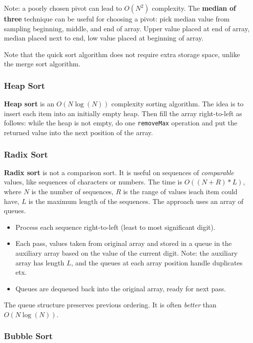Note: a poorly chosen pivot can lead to $O(N^{2})$ complexity. The \textbf{median of three} technique can be useful for choosing a pivot: pick median value from sampling beginning, middle, and end of array. Upper value placed at end of array, median placed next to end, low value placed at beginning of array. 

Note that the quick sort algorithm does not require extra storage space, unlike the merge sort algorithm. 

\subsubsection{Heap Sort}

\textbf{Heap sort} is an $O(N \log(N))$ complexity sorting algorithm. The idea is to insert each item into an initially empty heap. Then fill the array right-to-left as follows: while the heap is not empty, do one \texttt{removeMax} operation and put the returned value into the next position of the array. 

\subsubsection{Radix Sort}

\textbf{Radix sort} is not a comparison sort. It is useful on sequences of \textit{comparable} values, like sequences of characters or numbers. The time is $O((N + R)*L)$, where $N$ is the number of sequences, $R$ is the range of values ieach item could have, $L$ is the maximum length of the sequences. The approach uses an array of queues. 

\begin{itemize}
	\item Process each sequence right-to-left (least to most significant digit).
	\item Each pass, values taken from original array and stored in a queue in the auxiliary array based on the value of the current digit. Note: the auxiliary array has length $L$, and the queues at each array position handle duplicates etx. 
	\item Queues are dequeued back into the original array, ready for next pass.
\end{itemize}

The queue structure preserves previous ordering. It is often \textit{better} than $O(N \log(N))$. 

\subsubsection{Bubble Sort}

